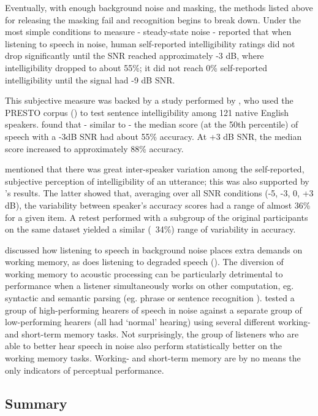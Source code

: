 Eventually, with enough background noise and masking, the methods listed above for releasing the masking fail and recognition begins to break down.  Under the most simple conditions to measure - steady-state noise - \cite{ding:13} reported that when listening to speech in noise, human self-reported intelligibility ratings did not drop significantly until the SNR reached approximately -3 dB, where intelligibility dropped to about 55\%;  it did not reach 0\% self-reported intelligibility until the signal had -9 dB SNR.

This subjective measure was backed by a study performed by \cite{gilbert:13}, who used the PRESTO corpus (\cite{garofolo:93}) to test sentence intelligibility among 121 native English speakers.  \cite{gilbert:13} found that - similar to \cite{ding:13} - the median score (at the 50th percentile) of speech with a -3dB SNR had about 55\% accuracy.  At +3 dB SNR, the median score increased to approximately 88\% accuracy.

\cite{ding:13} mentioned that there was great inter-speaker variation among the self-reported, subjective perception of intelligibility of an utterance; this was also supported by \cite{gilbert:13}'s results. The latter showed that, averaging over all SNR conditions (-5, -3, 0, +3 dB), the variability between speaker's accuracy scores had a range of almost 36\% for a given item.  A retest performed with a subgroup of the original participants on the same dataset yielded a similar (~34\%) range of variability in accuracy.  

\cite{francis:10} discussed how listening to speech in background noise places extra demands on working memory, as does listening to degraded speech (\cite{francis:09}).  The diversion of working memory to acoustic processing can be particularly detrimental to performance when a listener simultaneously works on other computation, eg. syntactic and semantic parsing (eg. phrase or sentence recognition \cite{caplan:99}). \cite{tamati:13} tested a group of high-performing hearers of speech in noise against a separate group of low-performing hearers (all had `normal' hearing) using several different working- and short-term memory tasks.  Not surprisingly, the group of listeners who are able to better hear speech in noise also perform statistically better on the working memory tasks.  Working- and short-term memory are by no means the only indicators of perceptual performance.


\subsection{Summary}

